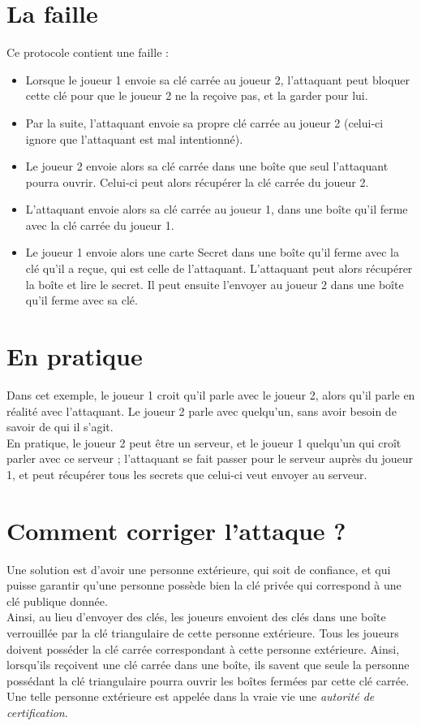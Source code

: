 \documentclass[a4paper,10pt]{article}
\begin{document}
\section{La faille}
Ce protocole contient une faille :
\begin{itemize}
 \item Lorsque le joueur 1 envoie sa clé carrée au joueur 2, l'attaquant peut bloquer cette clé pour que le joueur 2 ne la reçoive pas, et la garder pour lui.
 \item Par la suite, l'attaquant envoie sa propre clé carrée au joueur 2 (celui-ci ignore que l'attaquant est mal intentionné).
 \item Le joueur 2 envoie alors sa clé carrée dans une boîte que seul l'attaquant pourra ouvrir. Celui-ci peut alors récupérer la clé carrée du joueur 2.
 \item L'attaquant envoie alors sa clé carrée au joueur 1, dans une boîte qu'il ferme avec la clé carrée du joueur 1.
 \item Le joueur 1 envoie alors une carte Secret dans une boîte qu'il ferme avec la clé qu'il a reçue, qui est celle de l'attaquant. L'attaquant peut alors récupérer la boîte et lire le secret. Il peut ensuite l'envoyer au joueur 2 dans une boîte qu'il ferme avec sa clé.
\end{itemize}

\section{En pratique}
Dans cet exemple, le joueur 1 croit qu'il parle avec le joueur 2, alors qu'il parle en réalité avec l'attaquant. Le joueur 2 parle avec quelqu'un, sans avoir besoin de savoir de qui il s'agit.\\
En pratique, le joueur 2 peut être un serveur, et le joueur 1 quelqu'un qui croît parler avec ce serveur ; l'attaquant se fait passer pour le serveur auprès du joueur 1, et peut récupérer tous les secrets que celui-ci veut envoyer au serveur.

\section{Comment corriger l'attaque ?}
Une solution est d'avoir une personne extérieure, qui soit de confiance, et qui puisse garantir qu'une personne possède bien la clé privée qui correspond à une clé publique donnée.\\Ainsi, au lieu d'envoyer des clés, les joueurs envoient des clés dans une boîte verrouillée par la clé triangulaire de cette personne extérieure. Tous les joueurs doivent posséder la clé carrée correspondant à cette personne extérieure. Ainsi, lorsqu'ils reçoivent une clé carrée dans une boîte, ils savent que seule la personne possédant la clé triangulaire pourra ouvrir les boîtes fermées par cette clé carrée.\\
Une telle personne extérieure est appelée dans la vraie vie une \emph{autorité de certification}.
\end{document}
